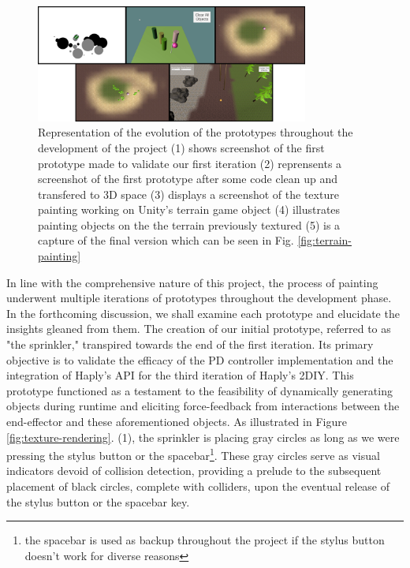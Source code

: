 \begin{figure}[htbp]
    \centering
    \includegraphics[width=0.8\textwidth]{images/timeline.png} 
    \caption{Representation of the evolution of the prototypes throughout the development of the project
    (1) shows screenshot of the first prototype made to validate our first iteration
    (2) reprensents a screenshot of the first prototype after some code clean up and transfered to 3D space
    (3) displays a screenshot of the texture painting working on Unity's terrain game object
    (4) illustrates painting objects on the the terrain previously textured
    (5) is a capture of the final version which can be seen in Fig. \ref{fig:terrain-painting}}
    \label{fig:evolution-painting}
\end{figure}

In line with the comprehensive nature of this project, the process of painting underwent multiple iterations of prototypes throughout the development phase. 
In the forthcoming discussion, we shall examine each prototype and elucidate the insights gleaned from them. 
The creation of our initial prototype, referred to as "the sprinkler," transpired towards the end of the first iteration. 
Its primary objective is to validate the efficacy of the PD controller implementation and the integration of Haply's API for the third iteration of Haply's 2DIY. 
This prototype functioned as a testament to the feasibility of dynamically generating objects during runtime and eliciting force-feedback from interactions between the end-effector and these aforementioned objects.
As illustrated in Figure \ref{fig:texture-rendering}. (1), the sprinkler is placing gray circles as long as we were pressing the stylus button or the spacebar\footnote{the spacebar is used as backup throughout the project if the stylus button doesn't work for diverse reasons}.
These gray circles serve as visual indicators devoid of collision detection, providing a prelude to the subsequent placement of black circles, complete with colliders, upon the eventual release of the stylus button or the spacebar key.



